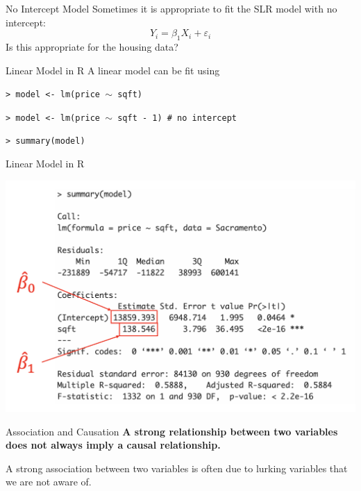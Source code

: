 \documentclass{beamer}
\begin{document}
\begin{frame}{No Intercept Model}
    Sometimes it is appropriate to fit the SLR model with no intercept:
    \begin{equation*}
        Y_i = \beta_1 X_i + \varepsilon_i
    \end{equation*}
    Is this appropriate for the housing data?
\end{frame}

\begin{frame}{Linear Model in R}
    A linear model can be fit using
    \vspace*{0.5em}

    \footnotesize
    \texttt{> model <- lm(price $\sim$ sqft)} \par
    \texttt{> model <- lm(price $\sim$ sqft - 1) \# no intercept} \par
    \texttt{> summary(model)} \par 
\end{frame}

\begin{frame}{Linear Model in R}
    \begin{center}
        \includegraphics[width=.9\linewidth]{figures/summary_estimates.png}
    \end{center}
\end{frame}

\begin{frame}{Association and Causation}
    \textbf{A strong relationship between two variables does not always imply a causal relationship.}

    \vspace*{1em}
    A strong association between two variables is often due to lurking variables that we are not aware of. 
\end{frame}
\end{document}
